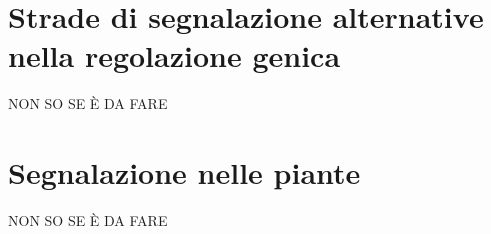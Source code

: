 \section{Strade di segnalazione alternative nella regolazione genica}
\begin{Huge}
	NON SO SE \`E DA FARE
\end{Huge}
\section{Segnalazione nelle piante}
\begin{Huge}
	NON SO SE \`E DA FARE
\end{Huge}
